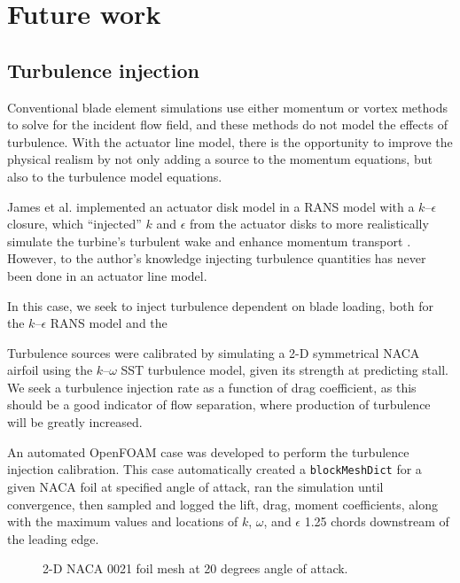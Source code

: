 \section{Future work}

\subsection{Turbulence injection}

Conventional blade element simulations use either momentum or vortex methods to
solve for the incident flow field, and these methods do not model the effects of
turbulence. With the actuator line model, there is the opportunity to improve
the physical realism by not only adding a source to the momentum equations, but
also to the turbulence model equations.

James et al. implemented an actuator disk model in a RANS model with a
$k$--$\epsilon$ closure, which ``injected'' $k$ and $\epsilon$ from the actuator
disks to more realistically simulate the turbine's turbulent wake and enhance
momentum transport \cite{James2010}. However, to the author's knowledge
injecting turbulence quantities has never been done in an actuator line model.

In this case, we seek to inject turbulence dependent on blade loading, both
for the $k$--$\epsilon$ RANS model and the

Turbulence sources were calibrated by simulating a 2-D symmetrical NACA airfoil
using the $k$--$\omega$ SST turbulence model, given its strength at predicting
stall. We seek a turbulence injection rate as a function of drag coefficient, as
this should be a good indicator of flow separation, where production of
turbulence will be greatly increased.

An automated OpenFOAM case was developed to perform the turbulence injection
calibration. This case automatically created a \texttt{blockMeshDict} for a
given NACA foil at specified angle of attack, ran the simulation until
convergence, then sampled and logged the lift, drag, moment coefficients, along
with the maximum values and locations of $k$, $\omega$, and $\epsilon$ 1.25
chords downstream of the leading edge.

\begin{figure}[ht]
    \centering
    
    \caption{2-D NACA 0021 foil mesh at 20 degrees angle of attack.}
    
    \label{fig:NACA-foil-mesh}
\end{figure}


